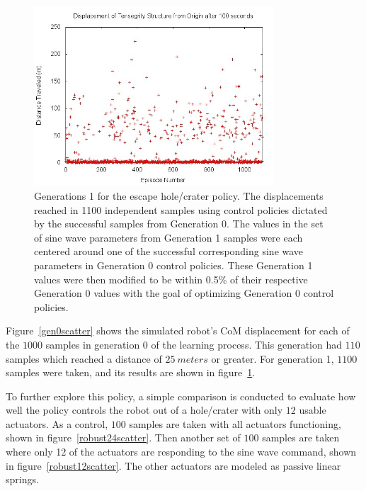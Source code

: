 \begin{figure}[thpb]
\centering
\includegraphics[width=0.8\textwidth]{tex/ARMS_2015/Pictures/gen1distances.jpg}
\caption{Generation 1}
\label{gen1scatter}
\caption{Generations 1 for the escape hole/crater policy. The displacements reached in 1100 independent samples using control policies dictated by the successful samples from Generation 0. The values in the set of sine wave parameters from Generation 1 samples were each centered around one of the successful corresponding sine wave parameters in Generation 0 control policies. These Generation 1 values were then modified to be within 0.5\% of their respective Generation 0 values with the goal of optimizing Generation 0 control policies.}
\end{figure}

Figure~\ref{gen0scatter} shows the simulated robot's CoM displacement for each of the \(1000\) samples in generation 0 of the learning process.
This generation had \(110\) samples which reached a distance of \(\SI{25}{meters}\) or greater.
For generation 1, \(1100\) samples were taken, and its results are shown in figure~\ref{gen1scatter}.

To further explore this policy, a simple comparison is conducted to evaluate how well the policy controls the robot out of a hole/crater with only \(12\) usable actuators.
As a control, \(100\) samples are taken with all actuators functioning, shown in figure~\ref{robust24scatter}.
Then another set of \(100\) samples are taken where only 12 of the actuators are responding to the sine wave command, shown in figure~\ref{robust12scatter}.
The other actuators are modeled as passive linear springs.

